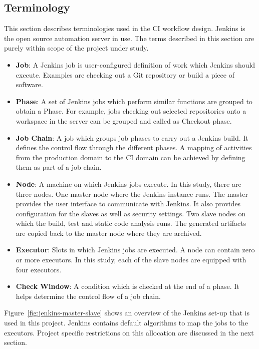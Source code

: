 \documentclass[12pt, a4paper, titlepage]{scrartcl}
\begin{document}
\subsection{Terminology}
This section describes terminologies used in the CI workflow design. Jenkins is the open source automation server in use. The terms described in this section are purely within scope of the project under study. 
\begin{itemize}
\item \textbf{Job}: A Jenkins job is user-configured definition of work which Jenkins should execute. Examples are checking out a Git repository or build a piece of software.
\item \textbf{Phase}: A set of Jenkins jobs which perform similar functions are grouped to obtain a Phase. For example, jobs checking out selected repositories onto a workspace in the server can be grouped and called as Checkout phase. 
\item \textbf{Job Chain}: A job which groups job phases to carry out a Jenkins build. It defines the control flow through the different phases. A mapping of activities from the production domain to the CI domain can be achieved by defining them as part of a job chain.  
\item \textbf{Node}: A machine on which Jenkins jobs execute. In this study, there are three nodes. One master node where the Jenkins instance runs. The master provides the user interface to communicate with Jenkins. It also provides configuration for the slaves as well as security settings. Two slave nodes on which the build, test and static code analysis runs. The generated artifacts are copied back to the master node where they are archived. 
\item \textbf{Executor}: Slots in which Jenkins jobs are executed. A node can contain zero or more executors. In this study, each of the slave nodes are equipped with four executors. 
\item \textbf{Check Window}: A condition which is checked at the end of a phase. It helps determine the control flow of a job chain. 
\end{itemize}
\par Figure~\ref{fig:jenkins-master-slave} shows an overview of the Jenkins set-up that is used in this project. Jenkins contains default algorithms to map the jobs to the executors. Project specific restrictions on this allocation are discussed in the next section. 
\end{document}
